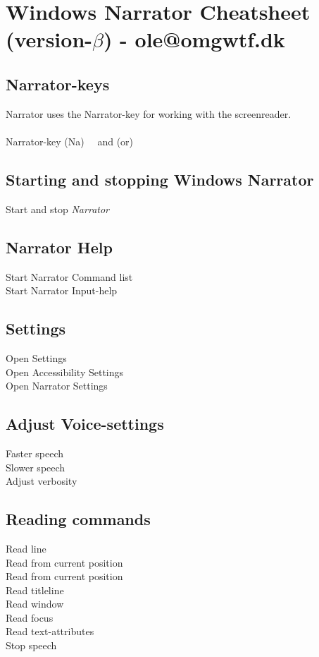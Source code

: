 \documentclass[a4paper, landscape, 11pt]{scrartcl}
\newcommand{\command}[2]{#1~\dotfill{}~#2\\} %
\begin{document}
\section*{Windows Narrator Cheatsheet (version-$\beta$) - ole@omgwtf.dk}

\hrulefill{}

\begin{multicols}{2}

\subsection*{Narrator-keys}
Narrator uses the Narrator-key for working with the screenreader. 
\\ \\
\command{Narrator-key (Na)}{ and (or) \keys{Insert}}

\subsection*{Starting and stopping Windows Narrator}
\command{Start and stop \emph{Narrator}}{\keys{\faWindows + \ctrl + \enter}}

\subsection*{Narrator Help}
\command{Start Narrator Command list}{}
\command{Start Narrator Input-help}{}

\subsection*{Settings}
\command{Open Settings}{}
\command{Open Accessibility Settings}{}
\command{Open Narrator Settings}{}


\subsection*{Adjust Voice-settings}
\command{Faster speech}{}
\command{Slower speech}{}
\command{Adjust verbosity}{}

\subsection*{Reading commands}
\command{Read line}{}
\command{Read from current position}{}
\command{Read from current position}{}
\command{Read titleline}{}
\command{Read window}{}
\command{Read focus}{}
\command{Read text-attributes}{}
\command{Stop speech}{\keys{\ctrl}}


\end{multicols}
\end{document}
